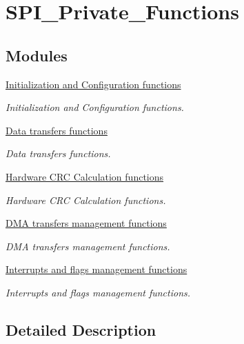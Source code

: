\hypertarget{group___s_p_i___private___functions}{}\section{S\+P\+I\+\_\+\+Private\+\_\+\+Functions}
\label{group___s_p_i___private___functions}
\subsection*{Modules}
\begin{DoxyCompactItemize}
\item 
\hyperlink{group___s_p_i___group1}{Initialization and Configuration functions}
\begin{DoxyCompactList}\small\item\em Initialization and Configuration functions. \end{DoxyCompactList}\item 
\hyperlink{group___s_p_i___group2}{Data transfers functions}
\begin{DoxyCompactList}\small\item\em Data transfers functions. \end{DoxyCompactList}\item 
\hyperlink{group___s_p_i___group3}{Hardware C\+R\+C Calculation functions}
\begin{DoxyCompactList}\small\item\em Hardware C\+R\+C Calculation functions. \end{DoxyCompactList}\item 
\hyperlink{group___s_p_i___group4}{D\+M\+A transfers management functions}
\begin{DoxyCompactList}\small\item\em D\+M\+A transfers management functions. \end{DoxyCompactList}\item 
\hyperlink{group___s_p_i___group5}{Interrupts and flags management functions}
\begin{DoxyCompactList}\small\item\em Interrupts and flags management functions. \end{DoxyCompactList}\end{DoxyCompactItemize}


\subsection{Detailed Description}
